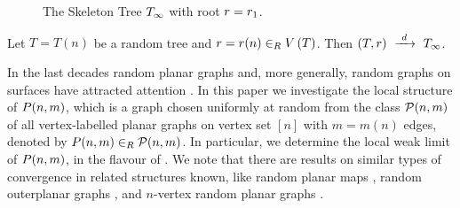 \begin{figure}[t]
	\caption{The Skeleton Tree $T_\infty$ with root $r=r_1$.}
	\label{LSfig:skeleton_tree}
\end{figure}
\begin{thm}\label{LSthm:limit_tree1}
Let $T=T(n)$ be a random tree and $r=r(n)\in_RV\left(T\right)$. Then $\left(T, r\right)~\xrightarrow{~d~}~T_\infty$.
\end{thm}
In the last decades random planar graphs and, more generally, random graphs on surfaces have attracted attention \cite{KangLuczak2012,McDiarmidStegerWelsh2005,GerkeMcDiarmidStegerWeissl2005,McDiarmidReed2008,Fusy2009,DrmotaGimenezNoy2011,McDiarmid2008,KangMosshammerSpruessel2020,ChapuyFusyGimenezMoharNoy2011}. In this paper we investigate the local structure of $P(n,m)$, which is a graph chosen uniformly at random from the class $\mathcal{P}(n,m)$ of all vertex-labelled planar graphs on vertex set $[n]$ with $m=m(n)$ edges, denoted by $P(n,m)\in_R\mathcal{P}(n,m)$. In particular, we determine the local weak limit of $P(n,m)$, in the flavour of . We note that there are results on similar types of convergence in related structures known, like random planar maps \cite{LeGallMiermont2012}, random outerplanar graphs \cite{PanagiotouStuflerWeller2016}, and $n$-vertex random planar graphs \cite{StuflerAppear}.

